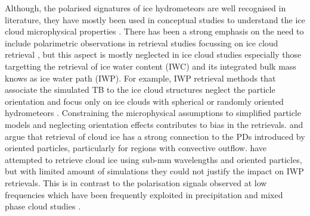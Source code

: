 \documentclass[amt, manuscript]{copernicus}
\begin{document}
Although, the polarised signatures of ice hydrometeors are well recognised in literature, they have mostly been used in conceptual studies to understand the ice cloud microphysical properties \citep{gong:micro:17}. There has been a strong emphasis on the need to include polarimetric observations in retrieval studies focussing on ice cloud retrieval \citep{xie:polar:11, defer:first:14, gong:micro:17, coy:sensi:20}, but this aspect is mostly neglected in ice cloud studies especially those targetting the retrieval of ice water content (IWC) and its integrated bulk mass knows as ice water path (IWP). For example, IWP retrieval methods that associate the simulated TB to the ice cloud structures neglect the particle orientation and focus only on ice clouds with spherical or randomly oriented hydrometeors \citep{evans:icecl:05, Zhao:retri:02}. Constraining the microphysical assumptions to simplified particle models and neglecting orientation effects contributes to bias in the retrievals. \citet{gong:micro:17} and \citet{miao:thepo:03} argue that retrieval of cloud ice has a strong connection to the PDs introduced by oriented particles, particularly for regions with convective outflow.  \citet{jimenez:2007:perfo} have attempted to retrieve cloud ice using sub-mm wavelengths and oriented particles, but with limited amount of simulations they could not justify the impact on IWP retrievals. This is in contrast to the polarisation signals observed at low frequencies which have been frequently exploited in precipitation and mixed phase cloud studies \citep{troitsky:polar:03, battaglia:rain:09, balaji2010retrieval}. 
\end{document}
